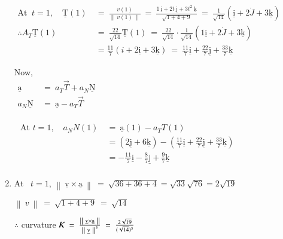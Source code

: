 \documentclass[12pt]{article}
\renewcommand{\vec}[1]{\underline{\mathrm{#1}}}
\let\oldkappa\kappa
\renewcommand{\kappa}{\scalebox{1.25}{$\oldkappa$}}
\newcommand{\norm}[1]{\left\lVert\ #1\ \right\rVert}
\begin{document}
\begin{enumerate}[label=\textbf{\mred{(\alph*)}}]
$\begin{aligned}
\text{At } \ t=1, \quad  \vec{T}(1)
\ &= \ \frac{v(1)}{\norm{v(1)}}
\ = \ \frac{1 \ \vec{i}+2 t  \ \vec{j}+3 t^2 \ \vec{k}}{\sqrt{1+4+9}}
\ = \ \frac{1}{\sqrt{14}}(\vec{i}+2 \dot{J}+3\vec{k})\\[1ex]
\therefore A_T \vec{T}(1)
\ &= \ \frac{22}{\sqrt{14}} \vec{T}(1) \ = \ \frac{22}{\sqrt{14}} \cdot \frac{1}{\sqrt{14}}(1\vec{i}+2 \dot{J}+3\vec{k}) \\[1ex]
& =\frac{11}{7}(i+2\vec{i}+3\vec{k})
\ = \ \frac{11}{7} \vec{i}+\frac{22}{7} \vec{j}+\frac{33}{7} \vec{k}
\end{aligned}$


\vspace{3ex}
Now,\\
$\begin{aligned}
   \vec{a} \ &= \ a_T \Vec{T} + a_N \vec{N} \\
   a_N \vec{N} \ &= \ \vec{a} - a_T \Vec{T} \\
\end{aligned}$

\vspace{1ex}
$\begin{aligned}
\text { At } t=1, \quad a_N N(1) \ &= \ \vec{a}(1)-a_T T(1) \\
&=(2 \vec{j} + 6 \vec{k}) -\left(\frac{11}{7} \vec{i}+\frac{22}{7} \vec{j}+\frac{33}{7}\vec{k}\right) \\
 &=-\frac{11}{7} \vec{i} - \frac{8}{7} \vec{j} + \frac{9}{7}\vec{k} \\
\end{aligned}$

\vspace{3ex}
\item
At \ $t=1$, \quad $\norm{\vec{v} \times\vec{a}} \ = \ \sqrt{36+36+4}=\sqrt{33} \sqrt{76}=2 \sqrt{19}$

\vspace{1ex}
$\norm{v} \ = \ \sqrt{1+4+9} \ = \ \sqrt{14}$

\vspace{1ex}
$\therefore$ curvature $\kappa \ = \ \frac{\norm{\vec{v} \times \vec{a}}}{\norm{\vec{v}}^3} \ = \ \frac{2 \sqrt{19}}{(\sqrt{14})^3}$

\end{enumerate}
\end{document}
